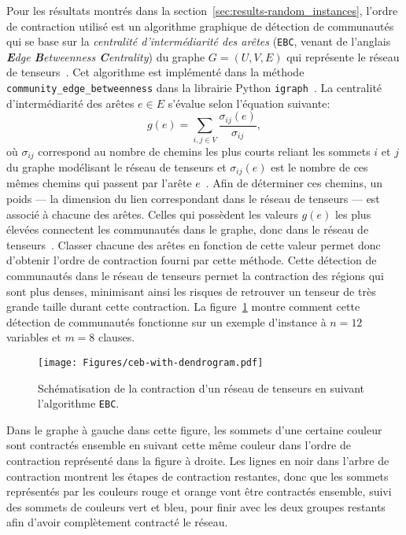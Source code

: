 Pour les résultats montrés dans la section~\ref{sec:results-random_instances}, l'ordre de contraction utilisé est un algorithme graphique de détection de communautés qui se base sur la \emph{centralité d'intermédiarité des arêtes} (\verb|EBC|, venant de l'anglais \textit{\textbf{E}dge \textbf{B}etweenness \textbf{C}entrality}) du graphe $G = (U, V, E)$ qui représente le réseau de tenseurs~\cite{girvan_community_2002}.
Cet algorithme est implémenté dans la méthode \verb|community_edge_betweenness| dans la librairie Python \verb|igraph|~\cite{csardi_igraph_nodate}.
La centralité d'intermédiarité des arêtes $e \in E$ s'évalue selon l'équation suivante:
\begin{equation}\label{eq:edge-betweenness-centrality}
    g(e) = \sum_{i, j \in V} \frac{\sigma_{ij}(e)}{\sigma_{ij}},
\end{equation}
où $\sigma_{ij}$ correspond au nombre de chemins les plus courts reliant les sommets $i$ et $j$ du graphe modélisant le réseau de tenseurs et $\sigma_{ij}(e)$ est le nombre de ces mêmes chemins qui passent par l'arête $e$~\cite{gray_hyper-optimized_2021,girvan_community_2002}.
Afin de déterminer ces chemins, un poids --- la dimension du lien correspondant dans le réseau de tenseurs --- est associé à chacune des arêtes.
Celles qui possèdent les valeurs $g(e)$ les plus élevées connectent les communautés dans le graphe, donc dans le réseau de tenseurs~\cite{girvan_community_2002}.
Classer chacune des arêtes en fonction de cette valeur permet donc d'obtenir l'ordre de contraction fourni par cette méthode.
Cette détection de communautés dans le réseau de tenseurs permet la contraction des régions qui sont plus denses, minimisant ainsi les risques de retrouver un tenseur de très grande taille durant cette contraction.
La figure~\ref{fig:ebc-with-dendrogram} montre  comment cette détection de communautés fonctionne sur un exemple d'instance à $n = 12$ variables et $m = 8$ clauses.
\begin{figure}[h]
    \centering
    \texttt{[image: Figures/ceb-with-dendrogram.pdf]}
    \caption[Schématisation de la contraction d'un réseau de tenseurs (\texttt{EBC}).]{Schématisation de la contraction d'un réseau de tenseurs en suivant l'algorithme \texttt{EBC}.}
    \label{fig:ebc-with-dendrogram}
\end{figure}
Dans le graphe à gauche dans cette figure, les sommets d'une certaine couleur sont contractés ensemble en suivant cette même couleur dans l'ordre de contraction représenté dans la figure à droite.
Les lignes en noir dans l'arbre de contraction montrent les étapes de contraction restantes, donc que les sommets représentés par les couleurs rouge et orange vont être contractés ensemble, suivi des sommets de couleurs vert et bleu, pour finir avec les deux groupes restants afin d'avoir complètement contracté le réseau.
